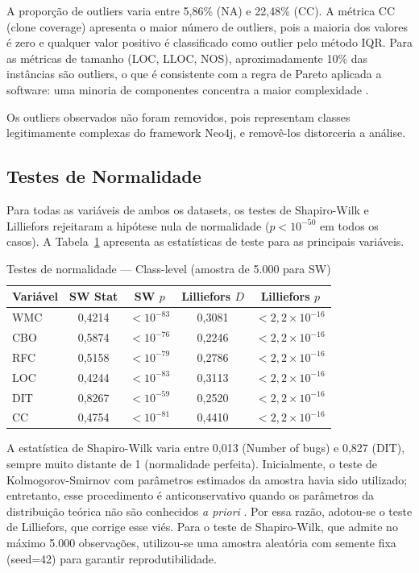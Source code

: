\documentclass[12pt]{article}
\begin{document}
A proporção de outliers varia entre 5,86\% (NA) e 22,48\% (CC). A métrica CC (clone coverage) apresenta o maior número de outliers, pois a maioria dos valores é zero e qualquer valor positivo é classificado como outlier pelo método IQR. Para as métricas de tamanho (LOC, LLOC, NOS), aproximadamente 10\% das instâncias são outliers, o que é consistente com a regra de Pareto aplicada a software: uma minoria de componentes concentra a maior complexidade \cite{nagappan2006}.

Os outliers observados não foram removidos, pois representam classes legitimamente complexas do framework Neo4j, e removê-los distorceria a análise.

\subsection{Testes de Normalidade}

Para todas as variáveis de ambos os datasets, os testes de Shapiro-Wilk e Lilliefors rejeitaram a hipótese nula de normalidade ($p < 10^{-50}$ em todos os casos). A Tabela~\ref{tab:normalidade} apresenta as estatísticas de teste para as principais variáveis.

\begin{table}[H]
\centering
\caption{Testes de normalidade --- Class-level (amostra de 5.000 para SW)}
\label{tab:normalidade}
\small
\begin{tabular}{lcccc}
\toprule
\textbf{Variável} & \textbf{SW Stat} & \textbf{SW $p$} & \textbf{Lilliefors $D$} & \textbf{Lilliefors $p$} \\
\midrule
WMC   & 0,4214 & $< 10^{-83}$ & 0,3081 & $< 2{,}2 \times 10^{-16}$ \\
CBO   & 0,5874 & $< 10^{-76}$ & 0,2246 & $< 2{,}2 \times 10^{-16}$ \\
RFC   & 0,5158 & $< 10^{-79}$ & 0,2786 & $< 2{,}2 \times 10^{-16}$ \\
LOC   & 0,4244 & $< 10^{-83}$ & 0,3113 & $< 2{,}2 \times 10^{-16}$ \\
DIT   & 0,8267 & $< 10^{-59}$ & 0,2520 & $< 2{,}2 \times 10^{-16}$ \\
CC    & 0,4754 & $< 10^{-81}$ & 0,4410 & $< 2{,}2 \times 10^{-16}$ \\
\bottomrule
\end{tabular}
\end{table}

A estatística de Shapiro-Wilk \cite{shapiro1965} varia entre 0,013 (Number of bugs) e 0,827 (DIT), sempre muito distante de 1 (normalidade perfeita). Inicialmente, o teste de Kolmogorov-Smirnov com parâmetros estimados da amostra havia sido utilizado; entretanto, esse procedimento é anticonservativo quando os parâmetros da distribuição teórica não são conhecidos \textit{a priori} \cite{lilliefors1967}. Por essa razão, adotou-se o teste de Lilliefors, que corrige esse viés. Para o teste de Shapiro-Wilk, que admite no máximo 5.000 observações, utilizou-se uma amostra aleatória com semente fixa (seed=42) para garantir reprodutibilidade.
\end{document}
